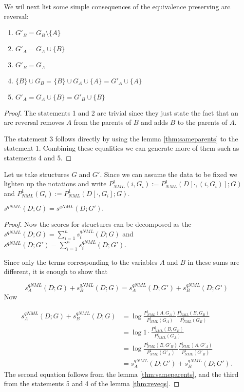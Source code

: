 We wil next list some simple consequences of the equivalence preserving
arc reversal:

\begin{lemma}
\label{thm:reveqs}
\hangindent\leftmargini
\hspace{1mm}
\begin{enumerate}
\item $G'_{B}=G_{B}\setminus\{A\}$
\item $G'_{A}=G_{A}\cup\{B\}$ 
\item $G'_{B}=G_{A}$
\item $\{B\}\cup G_{B}=\{B\}\cup G_{A}\cup\{A\}=G'_{A}\cup\{A\}$
\item $G'_{A}=G_{A}\cup\{B\}=G'_{B}\cup\{B\}$
\end{enumerate}
\end{lemma}


\begin{proof}

The statements 1 and 2 are trivial since they just state the fact
that an arc reversal removes $A$ from the parents of $B$ and adds
$B$ to the parents of $A$. 

The
statement 3 follows directly by using the lemma \ref{thm:sameparents}
to the statement 1. Combining these equalities we can generate more of them 
such as statements 4 and 5. 
\end{proof}

Let us take structures $G$ and $G'$. Since we can assume the data to be fixed we lighten
up the notations and write 
$P^1_{NML}(i,G_i) := P^1_{NML}(D[\cdot,(i,G_i)];G)$ and
$P^1_{NML}(G_i) := P^1_{NML}(D[\cdot,G_i];G)$.

\begin{theorem}
$  s^{qNML}(D;G)=s^{qNML}(D;G').$
\end{theorem}

\begin{proof}

  Now the scores for structures can be decomposed as the
  $s^{qNML}(D;G)=\sum_{i=1}^{n}s_i^{qNML}(D;G)$ and 
  $s^{qNML}(D;G')=\sum_{i=1}^{n}s_i^{qNML}(D;G')$.

Since only the terms corresponding to the variables $A$ and $B$
in these sums are different, it is enough to show that

$$
s_A^{qNML}(D;G)+s_B^{qNML}(D;G) = s_A^{qNML}(D;G')+s_B^{qNML}(D;G')
$$
Now 

\begin{align*}
s_A^{qNML}(D;G)+s_B^{qNML}(D;G)& =\log\frac{P^1_{NML}(A,G_{A})}{P^1_{NML}(G_{A})}\frac{P^1_{NML}(B,G_{B})}{P^1_{NML}(G_{B})}\\
 & =\log 1\cdot\frac{P^1_{NML}(B,G_{B})}{P^1_{NML}(G_{A})}\\
 & =\log \frac{P^1_{NML}(B,G'_{B})}{P^1_{NML}(G'_{A})}\frac{P^1_{NML}(A,G'_{A})}{P^1_{NML}(G'_{B})}\\
 & =s_A^{qNML}(D;G')+s_B^{qNML}(D;G').
\end{align*}
The second equation follows from the lemma \ref{thm:sameparents}, and the third from
the statements 5 and 4 of the lemma \ref{thm:reveqs}.
\end{proof}
